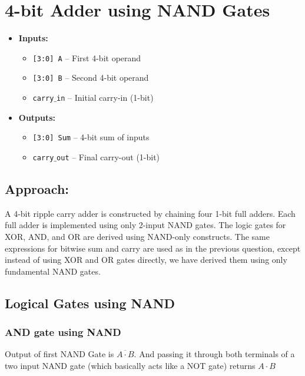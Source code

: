 \documentclass{article}
\begin{document}
\section{4-bit Adder using NAND Gates}
\begin{itemize}
    \item \textbf{Inputs:}
    \begin{itemize}
        \item \texttt{[3:0] A} – First 4-bit operand
        \item \texttt{[3:0] B} – Second 4-bit operand
        \item \texttt{carry$\_$in} – Initial carry-in (1-bit)
    \end{itemize}
    \item \textbf{Outputs:}
    \begin{itemize}
        \item \texttt{[3:0] Sum} – 4-bit sum of inputs
        \item \texttt{carry$\_$out} – Final carry-out (1-bit)
    \end{itemize}
\end{itemize}
\subsection*{Approach:}
A 4-bit ripple carry adder is constructed by chaining four 1-bit full adders. Each full adder is implemented using only 2-input NAND gates. The logic gates for XOR, AND, and OR are derived using NAND-only constructs. The same expressions for bitwise sum and carry are used as in the previous question, except instead of using XOR and OR gates directly, we have derived them using only fundamental NAND gates.
\subsection*{Logical Gates using NAND}
\subsubsection*{AND gate using NAND}
\begin{figure}[!h]
\centering
{}%

\label{fig:my_label}
\end{figure}
Output of first NAND Gate is $\overline{A\cdot B}$. And passing it through both terminals of a two input NAND gate (which basically acts like a NOT gate) returns $A\cdot B$
\end{document}
